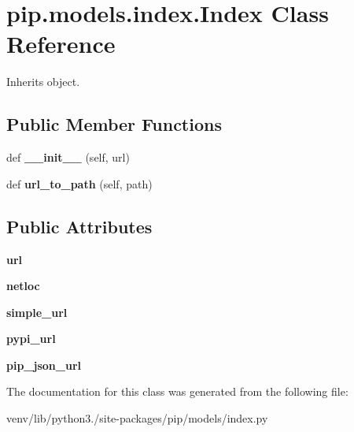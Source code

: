 \hypertarget{classpip_1_1models_1_1index_1_1_index}{}\section{pip.\+models.\+index.\+Index Class Reference}
\label{classpip_1_1models_1_1index_1_1_index}


Inherits object.

\subsection*{Public Member Functions}
\begin{DoxyCompactItemize}
\item 
\mbox{\label{classpip_1_1models_1_1index_1_1_index_aa4e6ba0ba49e63c39837c741e2bace1d}} 
def {\bfseries \+\_\+\+\_\+init\+\_\+\+\_\+} (self, url)
\item 
\mbox{\label{classpip_1_1models_1_1index_1_1_index_a8fd4bad948aa8be2e10e35f193acd933}} 
def {\bfseries url\+\_\+to\+\_\+path} (self, path)
\end{DoxyCompactItemize}
\subsection*{Public Attributes}
\begin{DoxyCompactItemize}
\item 
\mbox{\label{classpip_1_1models_1_1index_1_1_index_a0ab8f0ed54ec86682b34110b1d3fc837}} 
{\bfseries url}
\item 
\mbox{\label{classpip_1_1models_1_1index_1_1_index_a5211f8653ba671a9ce8fdf25ae264d24}} 
{\bfseries netloc}
\item 
\mbox{\label{classpip_1_1models_1_1index_1_1_index_a692a80271a12875ccacf4323243d053c}} 
{\bfseries simple\+\_\+url}
\item 
\mbox{\label{classpip_1_1models_1_1index_1_1_index_ac8b30fc16d076878ed8f0c4da5acefa2}} 
{\bfseries pypi\+\_\+url}
\item 
\mbox{\label{classpip_1_1models_1_1index_1_1_index_a312cbccc2f893a59e5c8d5d2e9c6e867}} 
{\bfseries pip\+\_\+json\+\_\+url}
\end{DoxyCompactItemize}


The documentation for this class was generated from the following file\+:\begin{DoxyCompactItemize}
\item 
venv/lib/python3./site-\/packages/pip/models/index.\+py\end{DoxyCompactItemize}

